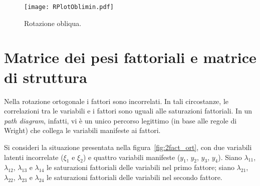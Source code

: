   \begin{figure}[h!]
  \centering
    \texttt{[image: RPlotOblimin.pdf]}
    \caption{Rotazione obliqua.}
    \label{fig:oblimin}
  \end{figure}


\section{Matrice dei pesi fattoriali e matrice di struttura}

Nella rotazione ortogonale i fattori sono incorrelati. 
In tali circostanze, le correlazioni tra le variabili e i fattori sono uguali alle saturazioni fattoriali. 
In un \emph{path diagram}, infatti, vi è un unico percorso legittimo (in base alle regole di Wright) che collega le variabili manifeste ai  fattori. 

Si consideri la situazione presentata nella figura~\ref{fig:2fact_ort}, con due variabili latenti incorrelate ($\xi_1$ e $\xi_2$) e quattro variabili manifeste ($y_1$, $y_2$, $y_3$, $y_4$). 
Siano $\lambda_{11}$, $\lambda_{12}$, $\lambda_{13}$ e $\lambda_{14}$ le saturazioni fattoriali delle variabili nel primo fattore; siano $\lambda_{21}$, $\lambda_{22}$, $\lambda_{23}$ e $\lambda_{24}$ le saturazioni fattoriali delle variabili nel secondo fattore.

